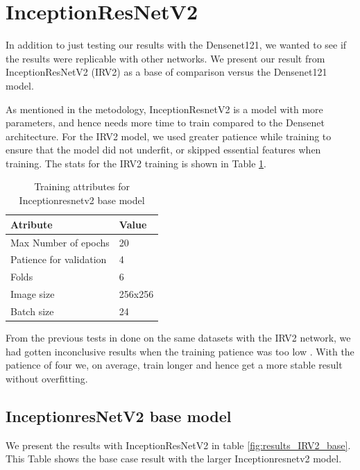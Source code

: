 \FloatBarrier
\section{InceptionResNetV2}
In addition to just testing our results with the Densenet121, we wanted to see if the results were replicable with other networks. We present our result from InceptionResNetV2 (IRV2) as a base of comparison versus the Densenet121 model. 


As mentioned in the metodology, InceptionResnetV2 is a model with more parameters, and hence needs more time to train compared to the Densenet architecture. 
For the IRV2 model, we used greater patience while training to ensure that the model did not underfit, or skipped essential features when training.
The stats for the IRV2 training is shown in Table \ref{tab:TrainingAttrIRV2}.



\begin{table}[h]
\caption{Training attributes for Inceptionresnetv2 base model }
\begin{center}
\begin{tabular}{ll}
\toprule
Atribute                & Value   \\
\midrule
Max Number of epochs    & 20      \\
Patience for validation & 4       \\
Folds                   & 6       \\
Image size              & 256x256 \\
Batch size              & 24      \\   
\bottomrule
\end{tabular}
\end{center}
\label{tab:TrainingAttrIRV2}
\end{table}

From the previous tests in done on the same datasets with the IRV2 network, we had gotten inconclusive results when the training patience was too low \cite{Mathias2019IEEpaper}. With the patience of four we, on average, train longer and hence get a more stable result without overfitting.

\FloatBarrier
\subsection{InceptionresNetV2 base model}

We present the results with InceptionResNetV2 in table \ref{fig:results_IRV2_base}.
This Table shows the base case result with the larger Inceptionresnetv2 model. 


